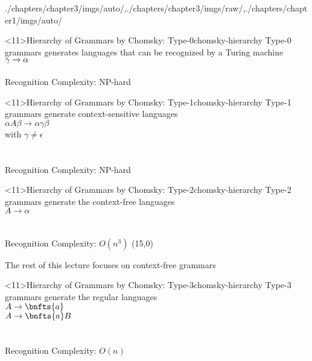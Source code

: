 \begin{graphicspathcontext}{{./chapters/chapter3/imgs/auto/},{./chapters/chapter3/imgs/raw/},{./chapters/chapter1/imgs/auto/}}
\begin{bibunit}[apalike]
\begin{rightlawnframe}<11>{{Hierarchy of Grammars} by Chomsky: Type-0}{chomsky-hierarchy}
	Type-0 grammars generates languages that can be recognized by a Turing machine \\[.5cm]
	$\gamma \rightarrow \alpha$ \\[.5cm]
	 \\[.5cm]
	Recognition Complexity: NP-hard
\end{rightlawnframe}

\begin{rightlawnframe}<11>{{Hierarchy of Grammars} by Chomsky: Type-1}{chomsky-hierarchy}
	Type-1 grammars generate context-sensitive languages \\[.5cm]
	$\alpha A\beta \rightarrow \alpha \gamma \beta$ \\
	with $\gamma\neq\epsilon$ \\[.5cm]
	 \\[.5cm]
	 \\[.5cm]
	Recognition Complexity: NP-hard
\end{rightlawnframe}

\begin{rightlawnframe}<11>{{Hierarchy of Grammars} by Chomsky: Type-2}{chomsky-hierarchy}
	Type-2 grammars generate the context-free languages \\[.5cm]
	$A \rightarrow \alpha$ \\[.5cm]
	 \\[.5cm]
	 \\[.5cm]
	Recognition Complexity: $O(n^3)$
	\putat(15,0){\parbox{2.5cm}{\alert{The rest of this lecture focuses on context-free grammars}}}
\end{rightlawnframe}

\begin{rightlawnframe}<11>{{Hierarchy of Grammars} by Chomsky: Type-3}{chomsky-hierarchy}
	Type-3 grammars generate the regular languages \\[.5cm]
	$A \rightarrow \bnfts{a}$ \\
	$A \rightarrow \bnfts{a}B$\\[.5cm]
	 \\[.5cm]
	 \\[.5cm]
	Recognition Complexity: $O(n)$
\end{rightlawnframe}


\end{bibunit}
\end{graphicspathcontext}
